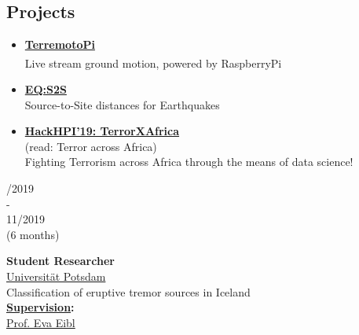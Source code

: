 \documentclass{article}
\begin{document}
\begin{minipage}[t]{0.7\textwidth}
\begin{minipage}[t]{0.52\textwidth}
		\vspace{0.3cm}
				
		\subsection*{\fontsize{18pt}{24pt}\selectfont \color{pblue} Projects}
		\begin{itemize}
		\item \textbf{\color{pblue}\underline{\color{pblue} \large TerremotoPi}} \href{https://github.com/silvioschwarz/TerremotoPi}{\Large \faGithub} \\
		Live stream ground motion, powered by RaspberryPi\textsuperscript{\textregistered}
		\item  \textbf{\color{pblue}\underline{\color{pblue} \large EQ:S2S}} \href{https://github.com/silvioschwarz/Earthquake-Distances}{\Large \faGithub}\\
			Source-to-Site distances for Earthquakes
		\item  \textbf{\color{pblue}\underline{\color{pblue}\large HackHPI'19: TerrorXAfrica}} \href{https://github.com/silvioschwarz/TerrorXAfrica}{\Large \faGithub}\\
		(read: Terror across Africa)\\
			Fighting Terrorism across Africa through the means of data science!
		\end{itemize}
		\end{minipage}	
		\hfill
		\vrule	
		\hfill
		\begin{minipage}[t]{0.45\textwidth}

\begin{minipage}[t]{0.25\textwidth}
		/2019\\ -\\ 11/2019 \\(6 months)
		\end{minipage}
		\hfill
		\begin{minipage}[t]{0.75\textwidth}
		\textbf{Student Researcher}\\
		\href{https://www.uni-potsdam.de/}{\color{pblue}Universität Potsdam}\\
	    Classification of eruptive tremor sources in Iceland\\
	      \textbf{\underline{Supervision}:}\\
	     \href{http://www.geo.uni-potsdam.de/mitarbeiterdetails/show/717/Eva_Eibl.html}{\color{pblue}Prof. Eva Eibl}
		\end{minipage}
		\vspace{0.3cm}
		

\end{minipage}
\end{minipage}
\end{document}
